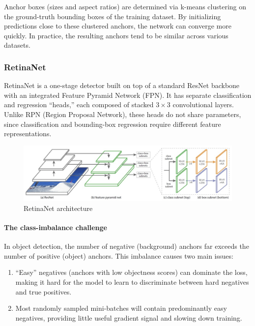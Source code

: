 Anchor boxes (sizes and aspect ratios) are determined via k-means clustering on the ground-truth bounding boxes of the training dataset. By initializing predictions close to these clustered anchors, the network can converge more quickly. In practice, the resulting anchors tend to be similar across various datasets.

\subsubsection{RetinaNet}

RetinaNet is a one-stage detector built on top of a standard ResNet backbone with an integrated Feature Pyramid Network (FPN). It has separate classification and regression “heads,” each composed of stacked $3\times3$ convolutional layers. Unlike RPN (Region Proposal Network), these heads do not share parameters, since classification and bounding-box regression require different feature representations.

\begin{figure}[htbp]
  \centering
  \includegraphics[width=0.9\linewidth]{./img/retina_net.jpg}
  \caption{RetinaNet architecture}
\end{figure}

\paragraph{The class-imbalance challenge}
In object detection, the number of negative (background) anchors far exceeds the number of positive (object) anchors. This imbalance causes two main issues:

\begin{enumerate}
  \item “Easy” negatives (anchors with low objectness scores) can dominate the loss, making it hard for the model to learn to discriminate between hard negatives and true positives.
  \item Most randomly sampled mini-batches will contain predominantly easy negatives, providing little useful gradient signal and slowing down training.
\end{enumerate}

